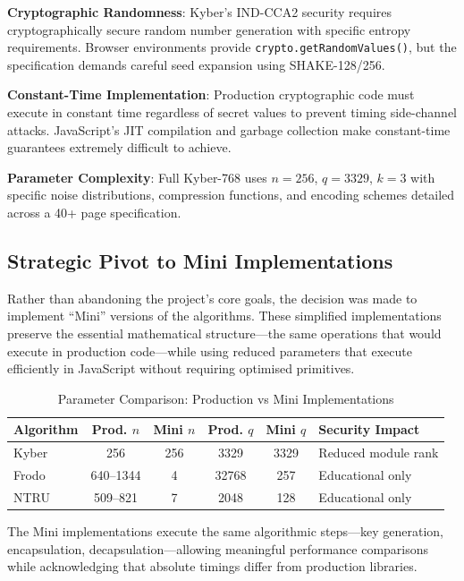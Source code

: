 \documentclass[11pt,a4paper]{article}
\begin{document}
\textbf{Cryptographic Randomness}: Kyber's IND-CCA2 security requires cryptographically secure random number generation with specific entropy requirements. Browser environments provide \texttt{crypto.getRandomValues()}, but the specification demands careful seed expansion using SHAKE-128/256.

\textbf{Constant-Time Implementation}: Production cryptographic code must execute in constant time regardless of secret values to prevent timing side-channel attacks. JavaScript's JIT compilation and garbage collection make constant-time guarantees extremely difficult to achieve.

\textbf{Parameter Complexity}: Full Kyber-768 uses $n=256$, $q=3329$, $k=3$ with specific noise distributions, compression functions, and encoding schemes detailed across a 40+ page specification.

\subsection{Strategic Pivot to Mini Implementations}

Rather than abandoning the project's core goals, the decision was made to implement ``Mini'' versions of the algorithms. These simplified implementations preserve the essential mathematical structure---the same operations that would execute in production code---while using reduced parameters that execute efficiently in JavaScript without requiring optimised primitives.

\begin{table}[H]
\centering
\caption{Parameter Comparison: Production vs Mini Implementations}
\label{tab:params}
\begin{tabular}{l|c|c|c|c|l}
\toprule
\textbf{Algorithm} & \textbf{Prod. $n$} & \textbf{Mini $n$} & \textbf{Prod. $q$} & \textbf{Mini $q$} & \textbf{Security Impact} \\
\midrule
Kyber & 256 & 256 & 3329 & 3329 & Reduced module rank \\
Frodo & 640--1344 & 4 & 32768 & 257 & Educational only \\
NTRU & 509--821 & 7 & 2048 & 128 & Educational only \\
\bottomrule
\end{tabular}
\end{table}

The Mini implementations execute the same algorithmic steps---key generation, encapsulation, decapsulation---allowing meaningful performance comparisons while acknowledging that absolute timings differ from production libraries.
\end{document}
